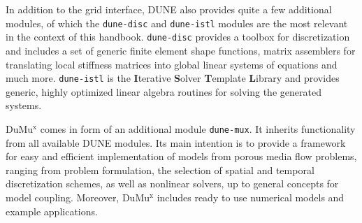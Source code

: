 In addition to the grid interface, DUNE also provides quite a few additional
modules, of which the \texttt{dune-disc} and \texttt{dune-istl} modules are the most
relevant in the context of this handbook.  \texttt{dune-disc} provides a toolbox for
discretization and includes a set of generic finite element shape
functions, matrix assemblers for translating local stiffness matrices
into global linear systems of equations and much more. \texttt{dune-istl} is the
\textbf{I}terative \textbf{S}olver \textbf{T}emplate \textbf{L}ibrary
and provides generic, highly optimized linear algebra routines for solving
the generated systems. 

DuMu$^\text{x}$ comes in form of an additional module \texttt{dune-mux}. 
It inherits functionality from all available DUNE modules. 
Its main intention is to provide a framework for easy and efficient 
implementation of models from porous media flow problems, 
ranging from problem formulation, the selection of 
spatial and temporal discretization schemes, as well as nonlinear solvers,  
up to general concepts for model coupling.  
Moreover, DuMu$^\text{x}$ includes ready to use numerical models and example applications. 

